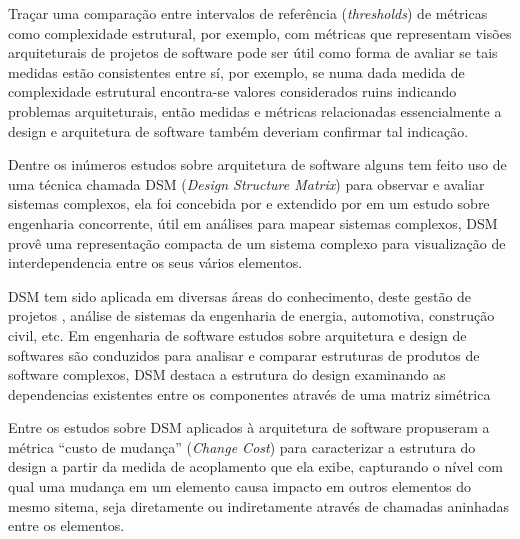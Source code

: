 
Traçar uma comparação entre intervalos de referência ({\it thresholds}) de
métricas como complexidade estrutural, por exemplo, com métricas que
representam visões arquiteturais de projetos de software pode ser útil como
forma de avaliar se tais medidas estão consistentes entre sí, por exemplo, se
numa dada medida de complexidade estrutural encontra-se valores considerados
ruins indicando problemas arquiteturais, então medidas e métricas relacionadas
essencialmente a design e arquitetura de software também deveriam confirmar tal
indicação.

Dentre os inúmeros estudos sobre arquitetura de software alguns tem feito uso
de uma técnica chamada DSM ({\it Design Structure Matrix}) para observar e
avaliar sistemas complexos, ela foi concebida por  e
extendido por  em um estudo sobre engenharia
concorrente, útil em análises para mapear sistemas complexos, DSM provê uma
representação compacta de um sistema complexo para visualização de
interdependencia entre os seus vários elementos.

DSM tem sido aplicada em diversas áreas do conhecimento, deste gestão de
projetos \cite{Browning2016}, análise de sistemas da engenharia de energia,
automotiva, construção civil, etc. Em engenharia de software
estudos sobre arquitetura e design de softwares são conduzidos para analisar e
comparar estruturas de produtos de software complexos, DSM
destaca a estrutura do design examinando as dependencias existentes entre
os componentes através de uma matriz simétrica \cite{Steward1981}

Entre os estudos sobre DSM aplicados à arquitetura de software
 propuseram a métrica ``custo de mudança'' ({\it Change Cost})
para caracterizar a estrutura do design a partir da medida de acoplamento que
ela exibe, capturando o nível com qual uma mudança em um elemento causa impacto
em outros elementos do mesmo sitema, seja diretamente ou indiretamente
através de chamadas aninhadas entre os elementos.


%
%
%

